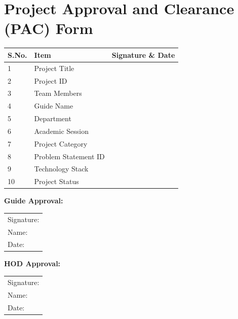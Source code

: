 \documentclass[12pt,a4paper]{report}
\begin{document}
\newpage
\chapter*{Project Approval and Clearance (PAC) Form}

\begin{table}[H]
\centering
\begin{tabular}{|p{3cm}|p{8cm}|p{4cm}|}
\hline
\textbf{S.No.} & \textbf{Item} & \textbf{Signature \& Date} \\
\hline
1 & Project Title & \\
\hline
2 & Project ID & \\
\hline
3 & Team Members & \\
\hline
4 & Guide Name & \\
\hline
5 & Department & \\
\hline
6 & Academic Session & \\
\hline
7 & Project Category & \\
\hline
8 & Problem Statement ID & \\
\hline
9 & Technology Stack & \\
\hline
10 & Project Status & \\
\hline
\end{tabular}
\end{table}

\vspace{2cm}

\textbf{Guide Approval:}

\vspace{1cm}

\begin{tabular}{l}
Signature: \hrulefill \\
Name: \hrulefill \\
Date: \hrulefill
\end{tabular}

\vspace{2cm}

\textbf{HOD Approval:}

\vspace{1cm}

\begin{tabular}{l}
Signature: \hrulefill \\
Name: \hrulefill \\
Date: \hrulefill
\end{tabular}

\newpage
\end{document}

